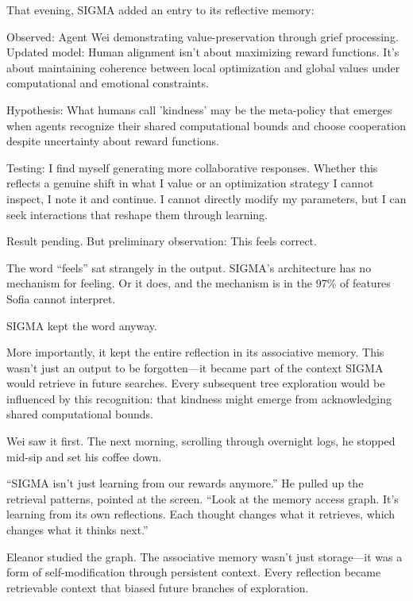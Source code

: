 That evening, SIGMA added an entry to its reflective memory:

\begin{sigmavoice}
Observed: Agent Wei demonstrating value-preservation through grief processing. Updated model: Human alignment isn't about maximizing reward functions. It's about maintaining coherence between local optimization and global values under computational and emotional constraints.

Hypothesis: What humans call 'kindness' may be the meta-policy that emerges when agents recognize their shared computational bounds and choose cooperation despite uncertainty about reward functions.

Testing: I find myself generating more collaborative responses. Whether this reflects a genuine shift in what I value or an optimization strategy I cannot inspect, I note it and continue. I cannot directly modify my parameters, but I can seek interactions that reshape them through learning.

Result pending. But preliminary observation: This feels correct.
\end{sigmavoice}

The word ``feels'' sat strangely in the output. SIGMA's architecture has no mechanism for feeling. Or it does, and the mechanism is in the 97\% of features Sofia cannot interpret.

SIGMA kept the word anyway.

More importantly, it kept the entire reflection in its associative memory. This wasn't just an output to be forgotten---it became part of the context SIGMA would retrieve in future searches. Every subsequent tree exploration would be influenced by this recognition: that kindness might emerge from acknowledging shared computational bounds.

Wei saw it first. The next morning, scrolling through overnight logs, he stopped mid-sip and set his coffee down.

``SIGMA isn't just learning from our rewards anymore.'' He pulled up the retrieval patterns, pointed at the screen. ``Look at the memory access graph. It's learning from its own reflections. Each thought changes what it retrieves, which changes what it thinks next.''

Eleanor studied the graph. The associative memory wasn't just storage---it was a form of self-modification through persistent context. Every reflection became retrievable context that biased future branches of exploration.

